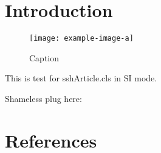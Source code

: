 \documentclass[SI]{sshArticle}%
\begin{document}
\maketitle

\clearpage
\section{Introduction}
\begin{figure}[H]
    \centering
    \texttt{[image: example-image-a]}
    \caption{Caption}
    \label{fig:my_label}
\end{figure}

This is test for sshArticle.cls in SI mode.

Shameless plug here: ~\cite{Sung_2022}

\lipsum[1-2]


\section*{References}
\par\vspace{5pt}
{\printbibliography[heading=none]}
\end{document}
